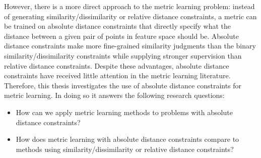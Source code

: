 However, there is a more direct approach to the metric learning problem: instead of generating similarity/dissimilarity or relative distance constraints, a metric can be trained on absolute distance constraints that directly specify what the distance between a given pair of points in feature space should be. Absolute distance constraints make more fine-grained similarity judgments than the binary similarity/dissimilarity constraints while supplying stronger supervision than relative distance constraints. Despite these advantages, absolute distance constraints have received little attention in the metric learning literature. Therefore, this thesis investigates the use of absolute distance constraints for metric learning. In doing so it answers the following research questions:
\begin{itemize}
\item How can we apply metric learning methods to problems with absolute distance constraints?
\item How does metric learning with absolute distance constraints compare to methods using similarity/dissimilarity or relative distance constraints?
\end{itemize}

